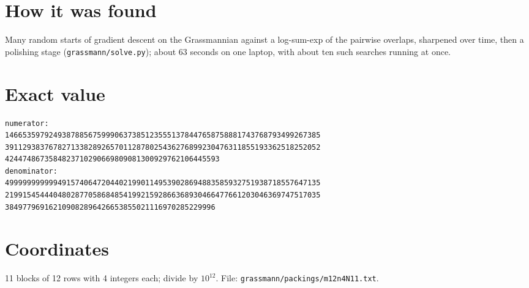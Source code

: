 \documentclass[11pt,a4paper]{article}
\begin{document}
\section{How it was found}
Many random starts of gradient descent on the Grassmannian against a log-sum-exp of the pairwise overlaps, sharpened over time, then a polishing stage (\texttt{grassmann/solve.py}); about 63 seconds on one laptop, with about ten such searches running at once.


\appendix
\section{Exact value}
{\small
\begin{verbatim}
numerator:
146653597924938788567599906373851235551378447658758881743768793499267385
391129383767827133828926570112878025436276899230476311855193362518252052
4244748673584823710290669809081300929762106445593
denominator:
499999999999491574064720440219901149539028694883585932751938718557647135
219915454440480287705868485419921592866368930466477661203046369747517035
384977969162109082896426653855021116970285229996
\end{verbatim}}

\section{Coordinates}
11 blocks of 12 rows with 4 integers each; divide by $10^{12}$. File: \texttt{grassmann/packings/m12n4N11.txt}.
{\tiny
\begin{multicols}{3}
\end{multicols}}
\end{document}
